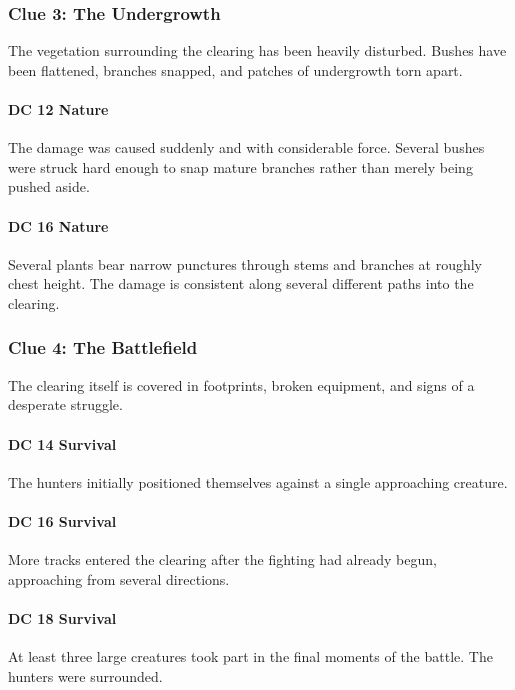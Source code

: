 \subsubsection*{Clue 3: The Undergrowth}
{\entryfont The vegetation surrounding the clearing has been heavily disturbed. Bushes have been flattened, branches snapped, and patches of undergrowth torn apart.

\paragraph{DC 12 Nature} The damage was caused suddenly and with considerable force. Several bushes were struck hard enough to snap mature branches rather than merely being pushed aside.

\paragraph{DC 16 Nature} Several plants bear narrow punctures through stems and branches at roughly chest height. The damage is consistent along several different paths into the clearing.}

\subsubsection*{Clue 4: The Battlefield}
{\entryfont The clearing itself is covered in footprints, broken equipment, and signs of a desperate struggle.

\paragraph{DC 14 Survival} The hunters initially positioned themselves against a single approaching creature.

\paragraph{DC 16 Survival} More tracks entered the clearing after the fighting had already begun, approaching from several directions.

\paragraph{DC 18 Survival} At least three large creatures took part in the final moments of the battle. The hunters were surrounded.}

